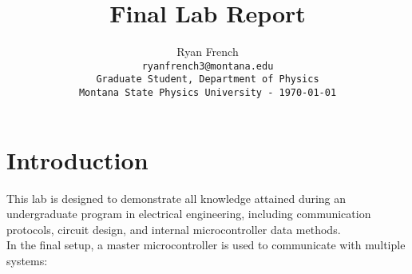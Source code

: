 \documentclass{article}
\title{Final Lab Report}
\author{Ryan French\\ \texttt{ryanfrench3@montana.edu}\\ \texttt{Graduate Student, Department of Physics}\\ \texttt{Montana State Physics University - \today}}
\date{}
\begin{document}
\maketitle



\section{Introduction}
\label{sec:Introduction}

This lab is designed to demonstrate all knowledge attained during an undergraduate program in electrical engineering, including communication protocols, circuit design, and internal microcontroller data methods.\\

\noindent In the final setup, a master microcontroller is used to communicate with multiple systems:
\end{document}
